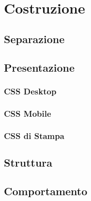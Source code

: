 \section{Costruzione}
    \subsection{Separazione}
    \subsection{Presentazione}
    \label{Presentazione}
        \subsubsection{CSS Desktop}
        \subsubsection{CSS Mobile}
        \subsubsection{CSS di Stampa}
    \subsection{Struttura}
    \subsection{Comportamento}

